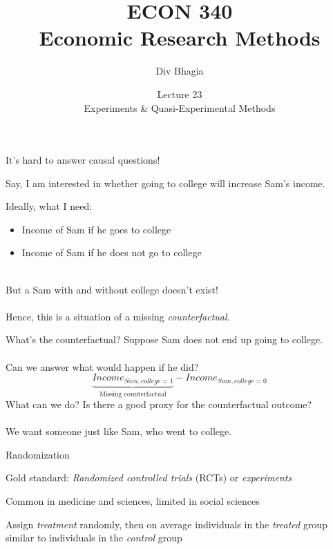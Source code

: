 \documentclass{./../div_teaching_slides}
\begin{document}
\title{ECON 340 \\ Economic Research Methods}
\author{Div Bhagia}
\date{Lecture 23 \\ Experiments \& Quasi-Experimental Methods}

\begin{frame}
\maketitle
\end{frame}

\begin{frame}{It's hard to answer causal questions!}
\begin{witemize}
  \item Say, I am interested in whether going to college will increase Sam's income.
  \item Ideally, what I need: \\
  \begin{itemize}
  \normalsize
  \item Income of Sam if he goes to college \\
  \item Income of Sam if he does not go to college \\~\\
\end{itemize}
But a Sam with and without college doesn’t exist! \\~\\
Hence, this is a situation of a missing \textit{counterfactual}. 
\end{witemize}
\end{frame}

\begin{frame}{What's the counterfactual?}
Suppose Sam does not end up going to college. \\~\\ 

Can we answer what would happen if he did?
$$ \underbrace{Income_{Sam,college=1}}_{\text{Missing counterfactual}}-Income_{Sam, college=0} $$
What can we do? Is there a good proxy for the counterfactual outcome? \\~\\
\pause We want someone just like Sam, who went to college. 
\end{frame}

\begin{frame}{Randomization}
\begin{witemize}
  \item Gold standard: \textit{Randomized controlled trials} (RCTs) or \textit{experiments}
  \item Common in medicine and sciences, limited in social sciences
  \item Assign \textit{treatment} randomly, then on average individuals in the \textit{treated} group similar to individuals in the \textit{control} group
   \end{witemize}
\end{frame}
\end{document}
